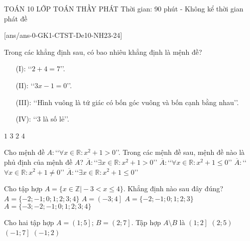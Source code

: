 \begin{name}
	{\tenchude}
	{TOÁN 10}
	{LỚP TOÁN THẦY PHÁT}
	{Thời gian: 90 phút - Không kể thời gian phát đề}
\end{name}
[ans/ans-0-GK1-CTST-De10-NH23-24]
\begin{ex}%
	Trong các khẳng định sau, có bao nhiêu khẳng định là mệnh đề?
	\begin{enumerate}
		\item[(I):] \lq\lq $2+4=7$\rq\rq.
		\item[(II):] \lq\lq$3x-1=0$\rq\rq.
		\item[(III):] \lq\lq Hình vuông là tứ giác có bốn góc vuông và bốn cạnh bằng nhau\rq\rq.
		\item[(IV):] \lq\lq$3$ là số lẻ\rq\rq.
	\end{enumerate}
	\choice
	{$1$}
	{\True $3$}
	{$2$}
	{$4$}
\end{ex}
\begin{ex}%
	Cho mệnh đề $A\colon$\lq\lq$\forall x \in \mathbb{R}\colon x^2+1>0$\rq\rq. Trong các mệnh đề sau, mệnh đề nào là phủ định của mệnh đề $A$?
	\choice
	{$\overline{A}\colon$\lq\lq$\exists x\in \mathbb{R}\colon x^2+1>0$\rq\rq}
	{$\overline{A}\colon$\lq\lq$\forall x\in \mathbb{R}\colon x^2+1 \leq 0$\rq\rq}
	{$\overline{A}\colon$\lq\lq$\forall x\in \mathbb{R}\colon x^2+1 \neq 0$\rq\rq}
	{\True $\overline{A}\colon $\lq\lq$\exists x\in \mathbb{R}\colon x^2+1 \leq 0$\rq\rq}
\end{ex}
\begin{ex}%
	Cho tập hợp $A=\{x\in \mathbb{Z} \Big| -3<x \leq 4\}$. Khẳng định nào sau đây đúng?
	\choice
	{\True $A=\{-2;-1;0;1;2;3;4\}$}
	{$A=\left(-3;4\right]$}
	{$A=\{-2;-1;0;1;2;3\}$}
	{$A=\{-3;-2;-1;0;1;2;3;4\}$}
\end{ex}
\begin{ex}%
	Cho hai tập hợp $A=\left(1;5\right]$; $B=\left(2;7\right]$. Tập hợp $A \setminus B$ là
	\choice
	{\True $\left(1;2\right]$}
	{$\left(2;5\right)$}
	{$\left(-1;7\right]$}
	{$\left(-1;2\right)$}
	\loigiai{
		Ta có $A \setminus B=\left(1;2\right]$. 	
	}
\end{ex}
